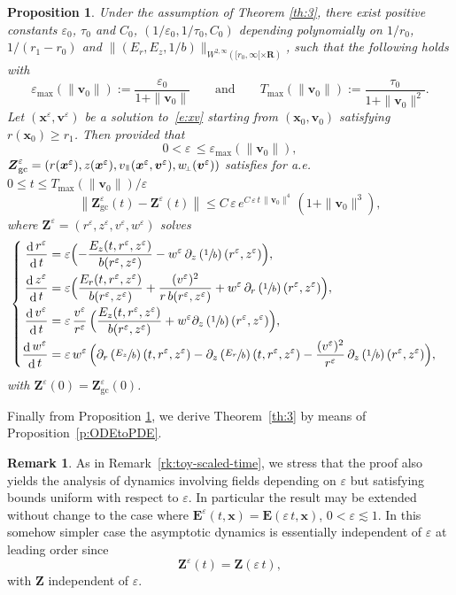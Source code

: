 \documentclass[JEP,XML,SOM,Unicode]{cedram}
\newenvironment{splitcases}
{\begin{cases}\begin{aligned}}
{\end{aligned}\end{cases}}
\newcommand{\sperp}{{\scriptscriptstyle\perp}}
\let\eps\varepsilon
\let\d\partial
\DeclareMathOperator\dD{d}\let\dd\dD
\theoremstyle{plain}
\newtheorem{proposition}[theorem]{Proposition}
\theoremstyle{definition}
\newtheorem{remark}[theorem]{Remark}
\newcommand\br{\begin{remark}}
\newcommand\er{\end{remark}}
\newcommand{\bpr}{\begin{proposition}}
\newcommand{\epr}{\end{proposition}}
\newcommand\R{\mathbf R}
\newcommand\bE{{\boldsymbol E}}
\newcommand\bfv{{\boldsymbol v}}
\newcommand\bfx{{\boldsymbol x}}
\newcommand\bfZ{{\boldsymbol Z}}
\newcommand\vpar{v_\mypar}
\newcommand\eperp{w_{\!\sperp}}
\let\e w
\newcommand\Er{E_r}
\newcommand\Ez{E_z}
\newcommand{\ZGC}{\bfZ_\mathrm{gc}}
\newcommand{\mypar}{{\mkern3mu\vphantom{\perp}\vrule depth 0pt\mkern2mu\vrule depth 0pt\mkern3mu}}
\begin{document}
\bpr
\label{rzve}
Under the assumption of Theorem \ref{th:3}, there exist positive constants $\eps_0$, $\tau_0$ and $C_0$, $(1/\eps_0,1/\tau_0,C_0)$ depending polynomially on $1/r_0$, $1/(r_1-r_0)$ and $\|(\Er,\Ez,1/b)\|_{W^{2,\infty}([r_0,\infty[\times\R)}$, such that the following holds with
\[
\eps_{\max}(\|\bfv_0\|):=\frac{\eps_0}{1+\|\bfv_0\|}\qquad\textrm{and}\qquad
T_{\max}(\|\bfv_0\|):=\frac{\tau_0}{1+\|\bfv_0\|^2}.
\]
Let $(\bfx^\eps,\bfv^\eps)$ be a solution to~\eqref{e:xv} starting from
$(\bfx_0,\bfv_0)$ satisfying $r(\bfx_0)\geq r_1$. Then provided that
\[0<\eps\,\leq \eps_{\max}(\|\bfv_0\|),
\]
$\ZGC^\eps=(r(\bfx^\eps), z(\bfx^\eps), \vpar(\bfx^\eps,\bfv^\eps), \eperp(\bfv^\eps))$ satisfies for a.e. $0\leq t\leq T_{\max}(\|\bfv_0\|)/\eps$
\[
\left\|\ZGC^\eps(t)-\bfZ^\eps(t)\right\|
\leq C\,\eps\,e^{C\,\eps\,t\,\|\bfv_0\|^4}
\,(1+\|\bfv_0\|^3),
\]
where $\bfZ^\eps=(r^\eps,z^\eps,v^\eps,\e^\eps)$ solves
\[
\begin{splitcases}
\frac{\dD r^\eps}{\dD t}&=\eps\Bigl(-\frac{\Ez(t,r^\eps,z^\eps)}{b(r^\eps,z^\eps)}-\e^\eps\,\d_z\left(\sfrac1b\right)(r^\eps,z^\eps)\Bigr),
\\
\frac{\dD z^\eps}{\dD t}&=
\eps\Bigl(\frac{\Er(t,r^\eps,z^\eps)}{b(r^\eps,z^\eps)}+\frac{(v^\eps)^2}{r\,b(r^\eps,z^\eps)}
+\e^\eps\,\d_r\left(\sfrac1b\right)(r^\eps,z^\eps)\Bigr),
\\
\frac{\dD v^\eps}{\dD t}
&=
\eps\,\frac{v^\eps}{r^\eps}\,\Bigl(\frac{\Ez(t,r^\eps,z^\eps)}{b(r^\eps,z^\eps)}
+\e^\eps\d_z\left(\sfrac1b\right)(r^\eps,z^\eps)\Bigr),
\\
\frac{\dD \e^\eps}{\dD t}
&=
\eps\,\e^\eps\,
\Bigl(\d_r\left(\sfrac{\Ez}{b}\right)(t,r^\eps,z^\eps)-\d_z\left(\sfrac{\Er}{b}\right)(t,r^\eps,z^\eps)
-\frac{(v^\eps)^2}{r^\eps}\,\d_z\left(\sfrac1b\right)(r^\eps,z^\eps)\Bigr),
\end{splitcases}
\]
with $\bfZ^\eps(0)=\ZGC^\eps(0)$.
\epr

Finally from Proposition \ref{rzve}, we derive Theorem~\ref{th:3} by means of Proposition~\ref{p:ODEtoPDE}.

\br\label{rk:scaled-time}
As in Remark~\ref{rk:toy-scaled-time}, we stress that the proof also yields the analysis of dynamics involving fields depending on $\eps$ but satisfying bounds uniform with respect to $\eps$. In particular the result may be extended without change to the case where $\bE^\eps(t,\bfx)=\bE(\eps\,t,\bfx)$, $0<\eps\lesssim 1$. In this somehow simpler case the asymptotic dynamics is essentially independent of $\eps$ at leading order since\vspace*{-3pt}\enlargethispage{\baselineskip}%
\[
\bfZ^\eps(t)=\bfZ(\eps\,t),
\]
with $\bfZ$ independent of $\eps$.
\er
\end{document}
